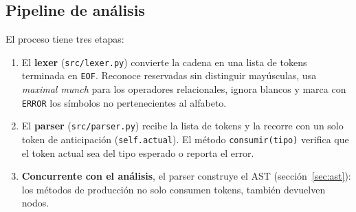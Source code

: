 \documentclass[12pt,a4paper]{article}
\begin{document}
\subsection{Pipeline de análisis}
El proceso tiene tres etapas:
\begin{enumerate}
  \item El \textbf{lexer} (\texttt{src/lexer.py}) convierte la cadena en una
        lista de tokens terminada en \texttt{EOF}. Reconoce reservadas sin
        distinguir mayúsculas, usa \emph{maximal munch} para los operadores
        relacionales, ignora blancos y marca con \texttt{ERROR} los símbolos
        no pertenecientes al alfabeto.
  \item El \textbf{parser} (\texttt{src/parser.py}) recibe la lista de
        tokens y la recorre con un solo token de anticipación
        (\texttt{self.actual}). El método \texttt{consumir(tipo)} verifica
        que el token actual sea del tipo esperado o reporta el error.
  \item \textbf{Concurrente con el análisis}, el parser construye el AST
        (sección~\ref{sec:ast}): los métodos de producción no solo consumen
        tokens, también devuelven nodos.
\end{enumerate}
\end{document}
